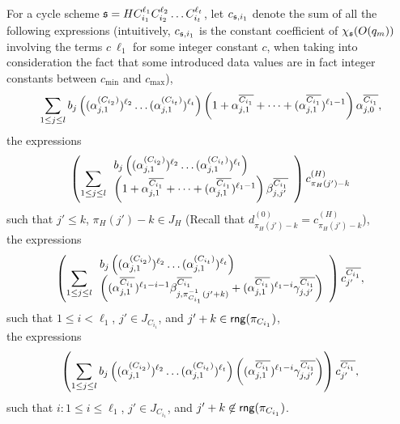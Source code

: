 \begin{appendix}
For a cycle scheme ${\mathfrak{s} }=HC_{i_1}^{\ell_1} C_{i_2}^{\ell_2} \dots C_{i_t}^{\ell_t}$, let $c_{{\mathfrak{s} },i_1}$ denote the sum of all the following expressions (intuitively, $c_{{\mathfrak{s} },i_1}$ is the constant coefficient of $\chi_{\mathfrak{s} }(O(q_m))$ involving the terms $ c\ \ell_1$ for some integer constant $c$, when taking into consideration the fact that some introduced data values are in fact integer constants between $c_{\min}$ and $c_{\max}$),
\[
\sum \limits_{1 \le j \le l} 
b_j \left((\alpha^{(C_{i_2})}_{j,1})^{\ell_2} \dots (\alpha^{(C_{i_t})}_{j,1})^{\ell_t}\right) 
\left(1+\alpha^{\overline{C_{i_1}}}_{j,1} + \dots + (\alpha^{\overline{C_{i_1}}}_{j,1})^{\ell_1-1} \right) \alpha^{\overline{C_{i_1}}}_{j,0},
\]
the expressions 
\[
\left(\sum \limits_{1 \le j \le l} 
\begin{array}{l}
b_j \left((\alpha^{(C_{i_2})}_{j,1})^{\ell_2} \dots (\alpha^{(C_{i_t})}_{j,1})^{\ell_t}\right) \\
\left(1+\alpha^{\overline{C_{i_1}}}_{j,1} + \dots + (\alpha^{\overline{C_{i_1}}}_{j,1})^{\ell_1-1} \right) \beta^{\overline{C_{i_1}}}_{j,j'}
\end{array}
\right) c^{(H)}_{\pi_H(j')-k}
\]
such that $j' \le k$, $\pi_H(j')-k \in J_H$ (Recall that $d^{(0)}_{\pi_H(j')-k}=c^{(H)}_{\pi_H(j')-k}$), \\
the expressions
\[
\left(\sum \limits_{1 \le j \le l} 
\begin{array}{l}
b_j \left((\alpha^{(C_{i_2})}_{j,1})^{\ell_2} \dots (\alpha^{(C_{i_t})}_{j,1})^{\ell_t}\right) \\
\left((\alpha^{\overline{C_{i_1}}}_{j,1})^{\ell_1-i-1} \beta^{\overline{C_{i_1}}}_{j,\pi^{-1}_{C_{i_1}}(j'+k)} + (\alpha^{\overline{C_{i_1}}}_{j,1})^{\ell_1-i} \gamma^{\overline{C_{i_1}}}_{j,j'}\right)
\end{array}
\right) c^{\overline{C_{i_1}}}_{j'},
\]
such that $1 \le i < \ell_1$, $j' \in J_{C_{i_1}}$, and $j'+k \in \mathsf{rng}(\pi_{C_{i_1}})$,\\
the expressions
\[
\left(\sum \limits_{1 \le j \le l} 
b_j \left((\alpha^{(C_{i_2})}_{j,1})^{\ell_2} \dots (\alpha^{(C_{i_t})}_{j,1})^{\ell_t}\right)  \left( (\alpha^{\overline{C_{i_1}}}_{j,1})^{\ell_1-i} \gamma^{\overline{C_{i_1}}}_{j,j'}\right)
\right) c^{\overline{C_{i_1}}}_{j'},
\]
such that $i: 1 \le i \le \ell_1$, $j' \in J_{C_{i_1}}$, and $j'+k \not \in \mathsf{rng}(\pi_{C_{i_1}})$.


\end{appendix}

